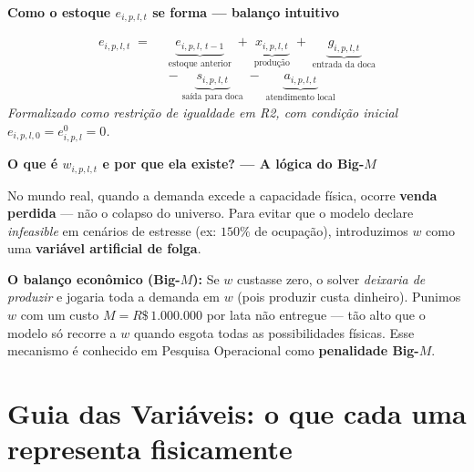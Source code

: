\documentclass[12pt, a4paper]{article}
\begin{document}
\vspace{8pt}

\begin{mdframed}[style=destaque]
  \textbf{\color{ballblue}Como o estoque $e_{i,p,l,t}$ se forma --- balan\c{c}o intuitivo}

  \medskip
  \[
    \begin{aligned}
      e_{i,p,l,t} \;=\;\;
      & \underbrace{e_{i,p,l,\,t-1}}_{\text{estoque anterior}}
        \;+\; \underbrace{x_{i,p,l,t}}_{\text{produ\c{c}\~{a}o}}
        \;+\; \underbrace{g_{i,p,l,t}}_{\text{entrada da doca}} \\[10pt]
      & -\; \underbrace{s_{i,p,l,t}}_{\text{sa\'{i}da para doca}}
        \;-\; \underbrace{a_{i,p,l,t}}_{\text{atendimento local}}
    \end{aligned}
  \]
  \textit{Formalizado como restri\c{c}\~{a}o de igualdade em R2, com condi\c{c}\~{a}o inicial $e_{i,p,l,0} = e^0_{i,p,l} = 0$.}
\end{mdframed}

\vspace{8pt}

\begin{mdframed}[style=destaque]
  \textbf{\color{ballblue}O que \'{e} $w_{i,p,l,t}$ e por que ela existe? --- A l\'{o}gica do Big-$M$}

  \medskip
  No mundo real, quando a demanda excede a capacidade f\'{i}sica, ocorre \textbf{venda perdida}
  --- n\~{a}o o colapso do universo. Para evitar que o modelo declare \textit{infeasible}
  em cen\'{a}rios de estresse (ex: $150\%$ de ocupa\c{c}\~{a}o), introduzimos $w$ como
  uma \textbf{vari\'{a}vel artificial de folga}.

  \medskip
  \textbf{O balan\c{c}o econ\^{o}mico (Big-$M$):} Se $w$ custasse zero, o solver
  \textit{deixaria de produzir} e jogaria toda a demanda em $w$ (pois produzir custa dinheiro).
  Punimos $w$ com um custo $M = R\$\,1.000.000$ por lata n\~{a}o entregue --- t\~{a}o alto que
  o modelo s\'{o} recorre a $w$ quando esgota todas as possibilidades f\'{i}sicas.
  Esse mecanismo \'{e} conhecido em Pesquisa Operacional como \textbf{penalidade Big-$M$}.
\end{mdframed}

\section{Guia das Vari\'{a}veis: o que cada uma representa fisicamente}
\end{document}
